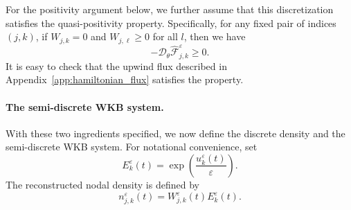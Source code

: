 \documentclass[11pt]{article}
\begin{document}
For the positivity argument below, we further assume that this discretization satisfies
the quasi-positivity property. 
Specifically,  for any fixed pair of indices $(j,k)$, if $W_{j,k}=0$ and $W_{j,\ell}\ge0$ for all $l$, then we have 
\begin{equation}\label{ass:H_flux}
-\mathcal D_\theta\widehat{\mathcal F}^{\varepsilon}_{j,k}\ge0 .
\end{equation}
It is easy to check that the upwind flux described in Appendix~\ref{app:hamiltonian_flux} satisfies the property. 





\paragraph{The semi-discrete WKB system.}
With these two ingredients specified, we now define the discrete density and
the semi-discrete WKB system. For notational convenience, set
\begin{equation}\label{def:E}
E_k^\varepsilon(t)
=
\exp\!\left(\frac{u_k^\varepsilon(t)}{\varepsilon}\right).
\end{equation}
The reconstructed nodal density is defined by
\begin{equation}\label{def:n_reconstructed}
n_{j,k}^\varepsilon(t)
=
W_{j,k}^\varepsilon(t)E_k^\varepsilon(t).
\end{equation}
\end{document}
